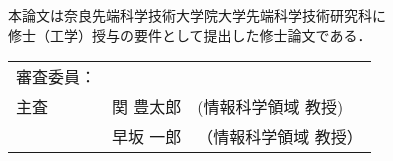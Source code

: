 \renewcommand\thepage{Title2}
\thispagestyle{empty}
\vspace*{8cm}
\begin{center}
本論文は奈良先端科学技術大学院大学先端科学技術研究科に$\ $ \\
修士（工学）授与の要件として提出した修士論文である．

 \bigskip

 \jauthor
 \vspace*{0.4cm}
 \begin{table}[h]
 \begin{center}
	\begin{tabular}[t]{lll}
    審査委員： & & \\
    主査  & 関 豊太郎 & (情報科学領域 教授) \\
	   & 早坂 一郎 & （情報科学領域 教授）
	\end{tabular}
 \end{center}
 \end{table}
 \end{center}
